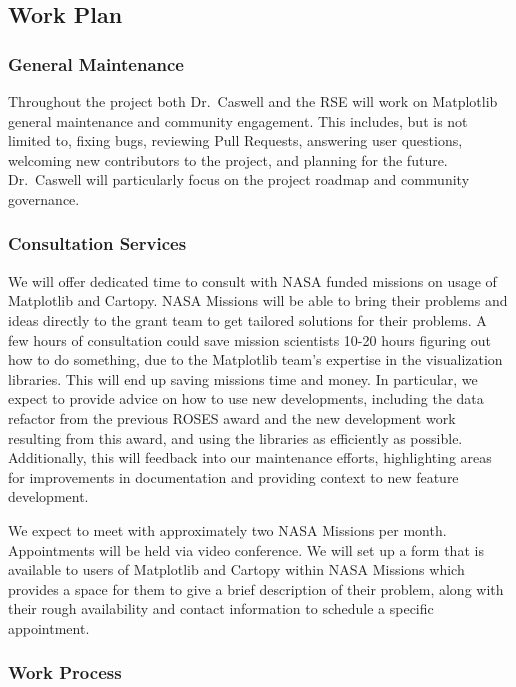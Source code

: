 \documentclass[12pt]{article}
\numberwithin{page}{section}
\begin{document}
\subsection{Work Plan}


\subsubsection{General Maintenance}

Throughout the project both Dr.\ Caswell and the RSE will work on
Matplotlib general maintenance and community engagement.  This includes,
but is not limited to, fixing bugs, reviewing Pull Requests, answering
user questions, welcoming new contributors to the project, and
planning for the future.  Dr.\ Caswell will particularly focus on
the project roadmap and community governance.

\subsubsection{Consultation Services}

We will offer dedicated time to consult with NASA funded missions on usage of Matplotlib and Cartopy.
NASA Missions will be able to bring their problems and ideas directly to the grant team to get tailored solutions for their problems.
A few hours of consultation could save mission scientists 10-20 hours figuring out how to do something, due to the Matplotlib team's expertise in the visualization libraries.
This will end up saving missions time and money.
In particular, we expect to provide advice on how to use new developments, including the data refactor from the previous ROSES award and the new development work resulting from this award, and using the libraries as efficiently as possible.
Additionally, this will feedback into our maintenance efforts, highlighting areas for improvements in documentation and providing context to new feature development.

We expect to meet with approximately two NASA Missions per month.
Appointments will be held via video conference.
We will set up a form that is available to users of Matplotlib and Cartopy within NASA Missions which provides a space for them to give a brief description of their problem, along with their rough availability and contact information to schedule a specific appointment.


\subsubsection{Work Process}
\end{document}
